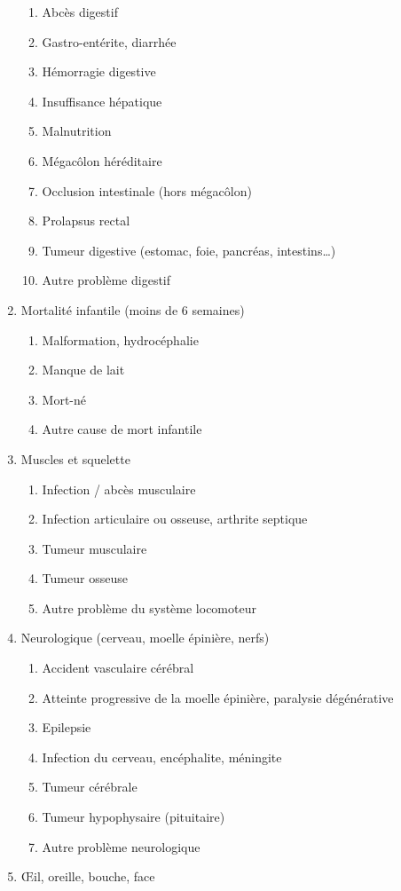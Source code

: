 \documentclass[a4paper,10pt]{article}
\begin{document}
\begin{enumerate}
\begin{enumerate}
\item Abcès digestif
\item Gastro-entérite, diarrhée
\item Hémorragie digestive
\item Insuffisance hépatique
\item Malnutrition
\item Mégacôlon héréditaire
\item Occlusion intestinale (hors mégacôlon)
\item Prolapsus rectal
\item Tumeur digestive (estomac, foie, pancréas, intestins…)
\item Autre problème digestif
\end{enumerate}
\item Mortalité infantile (moins de 6 semaines)
\begin{enumerate}
\item Malformation, hydrocéphalie
\item Manque de lait
\item Mort-né
\item Autre cause de mort infantile
\end{enumerate}
\item Muscles et squelette
\begin{enumerate}
\item Infection / abcès musculaire
\item Infection articulaire ou osseuse, arthrite septique
\item Tumeur musculaire
\item Tumeur osseuse
\item Autre problème du système locomoteur
\end{enumerate}
\item Neurologique (cerveau, moelle épinière, nerfs)
\begin{enumerate}
\item Accident vasculaire cérébral
\item Atteinte progressive de la moelle épinière, paralysie dégénérative
\item Epilepsie
\item Infection du cerveau, encéphalite, méningite
\item Tumeur cérébrale
\item Tumeur hypophysaire (pituitaire)
\item Autre problème neurologique
\end{enumerate} 
\item Œil, oreille, bouche, face

\end{enumerate}
\end{document}
